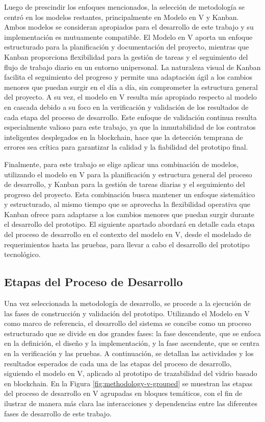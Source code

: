 Luego de prescindir los enfoques mencionados, la selección de metodología se centró en los modelos restantes, principalmente en Modelo en V y Kanban. Ambos modelos se consideran apropiados para el desarrollo de este trabajo y su implementación es mutuamente compatible. El Modelo en V aporta un enfoque estructurado para la planificación y documentación del proyecto, mientras que Kanban proporciona flexibilidad para la gestión de tareas y el seguimiento del flujo de trabajo diario en un entorno unipersonal. La naturaleza visual de Kanban facilita el seguimiento del progreso y permite una adaptación ágil a los cambios menores que puedan surgir en el día a día, sin comprometer la estructura general del proyecto. A su vez, el modelo en V resulta más apropiado respecto al modelo en cascada debido a su foco en la verificación y validación de los resultados de cada etapa del proceso de desarrollo. Este enfoque de validación continua resulta especialmente valioso para este trabajo, ya que la inmutabilidad de los contratos inteligentes desplegados en la blockchain, hace que la detección temprana de errores sea crítica para garantizar la calidad y la fiabilidad del prototipo final. 

Finalmente, para este trabajo se elige aplicar una combinación de modelos, utilizando el modelo en V para la planificación y estructura general del proceso de desarrollo, y Kanban para la gestión de tareas diarias y el seguimiento del progreso del proyecto. Esta combinación busca mantener un enfoque sistemático y estructurado, al mismo tiempo que se aprovecha la flexibilidad operativa que Kanban ofrece para adaptarse a los cambios menores que puedan surgir durante el desarrollo del prototipo. El siguiente apartado abordará en detalle cada etapa del proceso de desarrollo en el contexto del modelo en V, desde el modelado de requerimientos hasta las pruebas, para llevar a cabo el desarrollo del prototipo tecnológico.

\subsection{Etapas del Proceso de Desarrollo}

Una vez seleccionada la metodología de desarrollo, se procede a la ejecución de las fases de construcción y validación del prototipo. Utilizando el Modelo en V como marco de referencia, el desarrollo del sistema se concibe como un proceso estructurado que se divide en dos grandes fases: la fase descendente, que se enfoca en la definición, el diseño y la implementación, y la fase ascendente, que se centra en la verificación y las pruebas. A continuación, se detallan las actividades y los resultados esperados de cada una de las etapas del proceso de desarrollo, siguiendo el modelo en V, aplicado al prototipo de trazabilidad del vidrio basado en blockchain. En la Figura \ref{fig:methodology-v-grouped} se muestran las etapas del proceso de desarrollo en V agrupadas en bloques temáticos, con el fin de ilustrar de manera más clara las interacciones y dependencias entre las diferentes fases de desarrollo de este trabajo.

